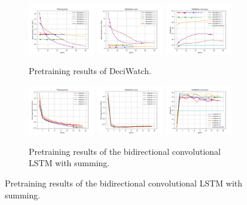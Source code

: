 \documentclass[./main.tex]{subfiles}
\begin{document}
\begin{figure}[htbp]
    \begin{subfigure}[b]{\textwidth}
        \centering
        \includegraphics[width=0.32\textwidth]{./entities/finetuned/deciwatch/train_losses.png}
        \includegraphics[width=0.32\textwidth]{./entities/finetuned/deciwatch/val_losses.png}
        \includegraphics[width=0.32\textwidth]{./entities/finetuned/deciwatch/val_accs.png}
        \caption{Pretraining results of DeciWatch.}
    \end{subfigure}
   \hfill

   \begin{subfigure}[b]{\textwidth}
    \centering
    \includegraphics[width=0.32\textwidth]{./entities/finetuned/unipose/train_losses.png}
    \includegraphics[width=0.32\textwidth]{./entities/finetuned/unipose/val_losses.png}
    \includegraphics[width=0.32\textwidth]{./entities/finetuned/unipose/val_accs.png}
    \caption{Pretraining results of the bidirectional convolutional LSTM with summing.}
    \end{subfigure}
    \hfill


\end{figure}
\end{document}
